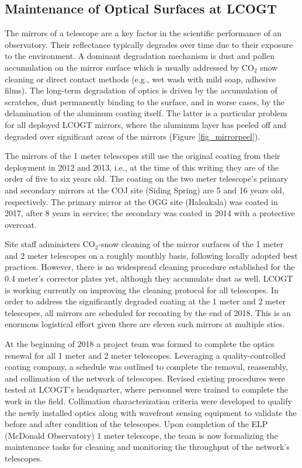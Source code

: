 \documentclass[]{spieman}
\begin{document}
\subsection{Maintenance of Optical Surfaces at LCOGT}


The mirrors of a telescope are a key factor in the  scientific performance of an observatory. Their
reflectance typically degrades over time due to their exposure to the environment. A dominant
degradation mechanism is dust and pollen accumulation on the mirror surface which is usually
addressed by CO$_2$ snow cleaning or direct contact methods (e.g., wet wash with mild soap, adhesive
films). The long-term degradation of optics is driven by the accumulation of scratches, dust
permanently binding to the surface, and in worse cases, by the delamination of the aluminum coating
itself. The latter is a particular problem for all deployed LCOGT mirrors, where the aluminum layer
has peeled off and degraded over significant areas of the mirrors (Figure \ref{fig_mirrorpeel}).

The mirrors of the 1 meter telescopes still use the original coating from their deployment in 2012
and 2013, i.e., at the time of this writing they are of the order of five to six years old. The
coating  on the two meter telescope's  primary and secondary mirrors at the COJ site (Siding
Spring) are 5  and 16 years old, respectively. The primary  mirror at the OGG site (Haleakala) was
coated in 2017, after 8 years in service; the secondary  was coated in 2014 with a protective
overcoat.

Site staff administers CO$_2$-snow cleaning of the mirror surfaces of the 1 meter and 2 meter
telescopes on a roughly monthly basis, following locally adopted best practices. However, there is
no widespread cleaning procedure established for the 0.4 meter's corrector plates yet, although
they accumulate dust as well. LCOGT is working currently on improving the cleaning protocol for all
telescopes. In order to address the significantly degraded coating at the 1 meter and 2 meter
telescopes, all mirrors are scheduled for recoating by the end of 2018. This is an enormous
logistical effort given there are eleven such mirrors at multiple sties.

At the beginning of 2018 a project team was formed to complete the optics renewal for all 1 meter and
2 meter telescopes.  Leveraging a quality-controlled coating company, a schedule was outlined to complete
the removal, reassembly, and collimation of the network of telescopes.  Revised 
existing procedures were tested at LCOGT's headquarter, where personnel were trained to complete the
work in the field.  Collimation characterization criteria were developed to qualify the newly
installed optics along with wavefront sensing equipment to validate the before and after condition
of the telescopes.  Upon completion of the ELP (McDonald Observatory) 1 meter telescope, the team 
is now formalizing the maintenance tasks for cleaning and monitoring the throughput of the network's 
telescopes.
\end{document}
